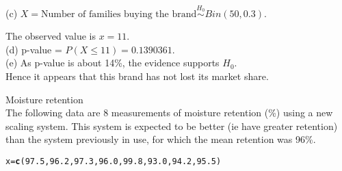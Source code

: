 \documentclass[bigtut]{tutorial}\usepackage[]{graphicx}\usepackage[]{color}
\makeatletter
\newcommand{\hlnum}[1]{\textcolor[rgb]{0.686,0.059,0.569}{#1}}%
\newcommand{\hlstd}[1]{\textcolor[rgb]{0.345,0.345,0.345}{#1}}%
\newcommand{\hlkwb}[1]{\textcolor[rgb]{0.69,0.353,0.396}{#1}}%
\newcommand{\hlkwd}[1]{\textcolor[rgb]{0.737,0.353,0.396}{\textbf{#1}}}%
\newenvironment{kframe}{%
 \def\at@end@of@kframe{}%
 \ifinner\ifhmode%
  \def\at@end@of@kframe{\end{minipage}}%
  \begin{minipage}{\columnwidth}%
 \fi\fi%
 \def\FrameCommand##1{\hskip\@totalleftmargin \hskip-\fboxsep
 \colorbox{shadecolor}{##1}\hskip-\fboxsep
     \hskip-\linewidth \hskip-\@totalleftmargin \hskip\columnwidth}%
 \MakeFramed {\advance\hsize-\width
   \@totalleftmargin\z@ \linewidth\hsize
   \@setminipage}}%
 {\par\unskip\endMakeFramed%
 \at@end@of@kframe}
\newenvironment{knitrout}{}{} %
\makeatother
\begin{document}
\begin{tutorial}
\begin{questions}
\begin{solution}
(c)
 $X = \text{Number of families buying the brand} \overset{H_0}{\sim} Bin(50, 0.3)$. 

The observed value is $x=11$. \\
 
(d) 
  p-value = $P(X \leq 11) = 0.1390361$. \\

(e)
 As p-value is about 14\%, the evidence supports $H_{0}$. \\
 Hence it appears that this brand has not lost its market share.

\end{solution}






\question Moisture retention \\

The following data are 8 measurements of moisture
retention (\%) using a new scaling system. This system is expected
to be better (ie have greater retention) than the system previously
in use, for which the mean retention was 96\%. 

\begin{knitrout}
\color{fgcolor}\begin{kframe}
\begin{alltt}
\hlstd{x}\hlkwb{=}\hlkwd{c}\hlstd{(}\hlnum{97.5}\hlstd{,}\hlnum{96.2}\hlstd{,}\hlnum{97.3}\hlstd{,}\hlnum{96.0}\hlstd{,}\hlnum{99.8}\hlstd{,}\hlnum{93.0}\hlstd{,}\hlnum{94.2}\hlstd{,}\hlnum{95.5}\hlstd{)}
\end{alltt}
\end{kframe}
\end{knitrout}

\vspace{.5cm}
\end{questions}
\end{tutorial}
\end{document}
